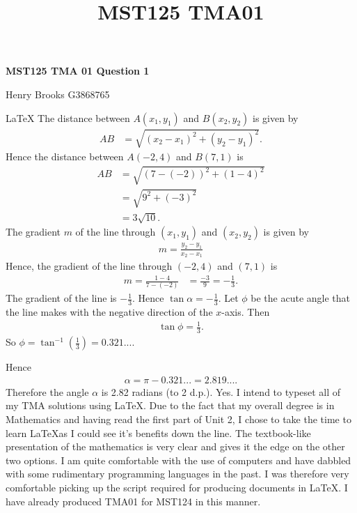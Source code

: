 \documentclass[a4paper,12pt]{article}
\title{MST125 TMA01}
\date{}
\numberwithin{equation}{section}
\begin{document}
\maketitle

\begin{question}
\qpart
\begin{center}
\textbf{MST125 TMA 01 Question 1}

Henry Brooks G3868765
\end{center}
LaTeX
\qpart
\qsubpart
The distance between $A(x_1,y_1)$ and $B(x_2,y_2)$ is given by
\begin{align*}
AB &=\sqrt{(x_2-x_1)^2 + (y_2-y_1)^2}.
\end{align*}
Hence the distance between $A(-2,4)$ and $B(7,1)$ is
\begin{align*}
AB &=\sqrt{(7-(-2))^2 + (1-4)^2}\\
&= \sqrt{9^2 +(-3)^2}\\
&= 3\sqrt{10}.
\end{align*}
\qsubpart
The gradient $m$ of the line through $(x_1,y_1)$ and $(x_2,y_2)$ is given by
\begin{align*}
m = \frac{y_2-y_1}{x_2-x_1}
\end{align*}
Hence, the gradient of the line through $(-2,4)$ and $(7,1)$ is
\begin{align*}
m = \frac{1-4}{7-(-2)} &= \frac{-3}{9} = -\frac{1}{3}.
\end{align*}
\qsubpart
The gradient of the line is $-\frac{1}{3}$. Hence $\tan\alpha=-\frac{1}{3}$. Let $\phi$ be the acute angle that the line makes with the negative direction of the $x$-axis. Then
\begin{align*}
\tan\phi = \frac{1}{3}.
\end{align*}
So $\phi = \tan^{-1}(\frac{1}{3}) = 0.321 ....$

Hence
\begin{align*}
\alpha = \pi - 0.321 ... = 2.819....
\end{align*}
Therefore the angle $\alpha$ is 2.82 radians (to 2 d.p.).
\qpart
Yes. I intend to typeset all of my TMA solutions using \LaTeX. Due to the fact that my overall degree is in Mathematics and having read the first part of Unit 2, I chose to take the time to learn \LaTeX as I could see it's benefits down the line. The textbook-like presentation of the mathematics is very clear and gives it the edge on the other two options. I am quite comfortable with the use of computers and have dabbled with some rudimentary programming languages in the past. I was therefore very comfortable picking up the script required for producing documents in \LaTeX. I have already produced TMA01 for MST124 in this manner.
\end{question}
\end{document}
